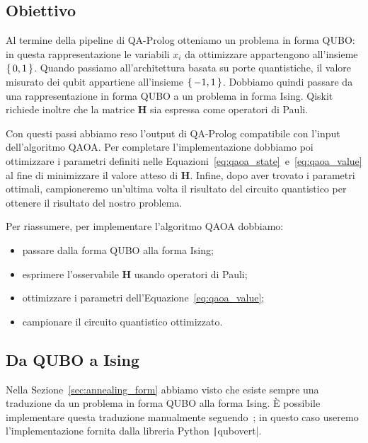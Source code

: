 \subsection{Obiettivo}
Al termine della pipeline di QA-Prolog otteniamo un problema in forma QUBO: in questa rappresentazione le variabili $x_i$ da ottimizzare appartengono all'insieme $\set{0, 1}$. Quando passiamo all'architettura basata su porte quantistiche, il valore misurato dei qubit appartiene all'insieme $\set{-1, 1}$. Dobbiamo quindi passare da una rappresentazione in forma QUBO a un problema in forma Ising. Qiskit richiede inoltre che la matrice $\mathbf{H}$ sia espressa come operatori di Pauli.

Con questi passi abbiamo reso l'output di QA-Prolog compatibile con l'input dell'algoritmo QAOA. Per completare l'implementazione dobbiamo poi ottimizzare i parametri definiti nelle Equazioni~\ref{eq:qaoa_state}~e~\ref{eq:qaoa_value} al fine di minimizzare il valore atteso di $\mathbf{H}$. Infine, dopo aver trovato i parametri ottimali, campioneremo un'ultima volta il risultato del circuito quantistico per ottenere il risultato del nostro problema.

Per riassumere, per implementare l'algoritmo QAOA dobbiamo:
\begin{itemize}
	\item passare dalla forma QUBO alla forma Ising;
	\item esprimere l'osservabile $\mathbf{H}$ usando operatori di Pauli;
	\item ottimizzare i parametri dell'Equazione~\ref{eq:qaoa_value};
	\item campionare il circuito quantistico ottimizzato.
\end{itemize}

\subsection{Da QUBO a Ising}
Nella Sezione~\ref{sec:annealing_form} abbiamo visto che esiste sempre una traduzione da un problema in forma QUBO alla forma Ising. È possibile implementare questa traduzione manualmente seguendo~\cite{bian2010ising}; in questo caso useremo l'implementazione fornita dalla libreria Python \texttt|qubovert|.

\begin{listingenv}[h]
	\caption{Dalla forma QUBO alla forma Ising}
	\label{lst:qubo_ising}
\end{listingenv}

